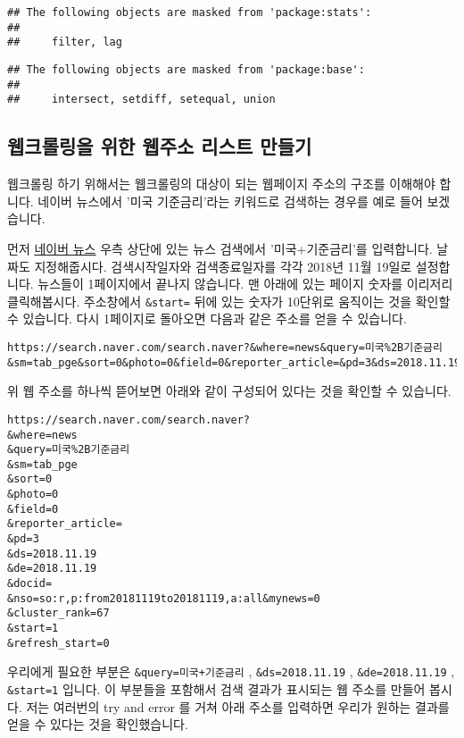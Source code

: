 \documentclass[]{article}
\begin{document}
\begin{verbatim}
## The following objects are masked from 'package:stats':
## 
##     filter, lag
\end{verbatim}

\begin{verbatim}
## The following objects are masked from 'package:base':
## 
##     intersect, setdiff, setequal, union
\end{verbatim}

\hypertarget{----}{%
\subsection{웹크롤링을 위한 웹주소 리스트 만들기}\label{----}}

웹크롤링 하기 위해서는 웹크롤링의 대상이 되는 웹페이지 주소의 구조를
이해해야 합니다. 네이버 뉴스에서 '미국 기준금리'라는 키워드로 검색하는
경우를 예로 들어 보겠습니다.

먼저 \href{https://news.naver.com/}{네이버 뉴스} 우측 상단에 있는 뉴스
검색에서 '미국+기준금리'를 입력합니다. 날짜도 지정해줍시다.
검색시작일자와 검색종료일자를 각각 2018년 11월 19일로 설정합니다.
뉴스들이 1페이지에서 끝나지 않습니다. 맨 아래에 있는 페이지 숫자를
이리저리 클릭해봅시다. 주소창에서 \texttt{\&start=} 뒤에 있는 숫자가
10단위로 움직이는 것을 확인할 수 있습니다. 다시 1페이지로 돌아오면
다음과 같은 주소를 얻을 수 있습니다.

\begin{verbatim}
https://search.naver.com/search.naver?&where=news&query=미국%2B기준금리&sm=tab_pge&sort=0&photo=0&field=0&reporter_article=&pd=3&ds=2018.11.19&de=2018.11.19&docid=&nso=so:r,p:from20181119to20181119,a:all&mynews=0&cluster_rank=67&start=1&refresh_start=0
\end{verbatim}

위 웹 주소를 하나씩 뜯어보면 아래와 같이 구성되어 있다는 것을 확인할 수
있습니다.

\begin{verbatim}
https://search.naver.com/search.naver?
&where=news
&query=미국%2B기준금리
&sm=tab_pge
&sort=0
&photo=0
&field=0
&reporter_article=
&pd=3
&ds=2018.11.19
&de=2018.11.19
&docid=
&nso=so:r,p:from20181119to20181119,a:all&mynews=0
&cluster_rank=67
&start=1
&refresh_start=0
\end{verbatim}

우리에게 필요한 부분은 \texttt{\&query=미국+기준금리} ,
\texttt{\&ds=2018.11.19} , \texttt{\&de=2018.11.19} , \texttt{\&start=1}
입니다. 이 부분들을 포함해서 검색 결과가 표시되는 웹 주소를 만들어
봅시다. 저는 여러번의 try and error 를 거쳐 아래 주소를 입력하면 우리가
원하는 결과를 얻을 수 있다는 것을 확인했습니다.
\end{document}
